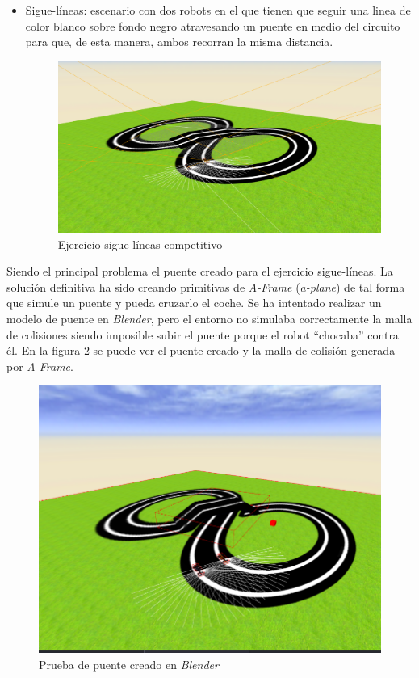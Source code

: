 \begin{itemize}
    \item Sigue-líneas: escenario con dos robots en el que tienen que seguir una linea de color blanco sobre fondo negro atravesando un puente en medio del circuito para que, de esta manera, ambos recorran la misma distancia.

    \begin{figure}[H]
        \centering            
        \includegraphics[scale=0.3]{img/ejercicio_siguelineas.png}
        \caption{Ejercicio sigue-líneas competitivo}
        \label{fig:siguelineas_competitivo}
    \end{figure}
\end{itemize}

Siendo el principal problema el puente creado para el ejercicio sigue-líneas. La solución definitiva ha sido creando primitivas de \textit{A-Frame} (\textit{a-plane}) de tal forma que simule un puente y pueda cruzarlo el coche. Se ha intentado realizar un modelo de puente en \textit{Blender}, pero el entorno no simulaba correctamente la malla de colisiones siendo imposible subir el puente porque el robot ``chocaba'' contra él. En la figura \ref{fig:prueba_puente} se puede ver el puente creado y la malla de colisión generada por \textit{A-Frame}.

    \begin{figure}[H]
        \centering            
        \includegraphics[scale=0.3]{img/prueba_puente.png}
        \caption{Prueba de puente creado en \textit{Blender}}
        \label{fig:prueba_puente}
    \end{figure}


